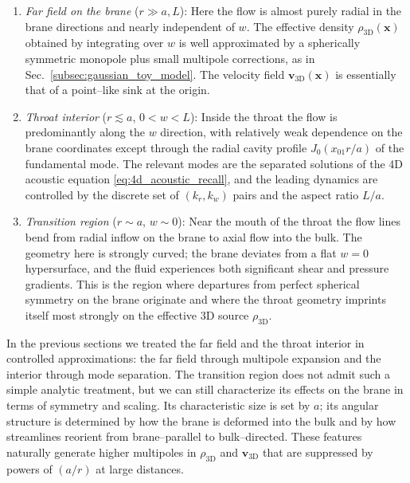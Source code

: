 \documentclass[12pt]{article}
\begin{document}
\begin{enumerate}
  \item \emph{Far field on the brane} ($r \gg a,L$): Here the flow is almost
  purely radial in the brane directions and nearly independent of $w$.  The
  effective density $\rho_{\mathrm{3D}}(\mathbf{x})$ obtained by integrating
  over $w$ is well approximated by a spherically symmetric monopole plus
  small multipole corrections, as in Sec.~\ref{subsec:gaussian_toy_model}.
  The velocity field $\mathbf{v}_{\mathrm{3D}}(\mathbf{x})$ is essentially
  that of a point--like sink at the origin.

  \item \emph{Throat interior} ($r \lesssim a$, $0<w<L$): Inside the throat
  the flow is predominantly along the $w$ direction, with relatively weak
  dependence on the brane coordinates except through the radial cavity
  profile $J_0(x_{01}r/a)$ of the fundamental mode.  The relevant modes are
  the separated solutions of the 4D acoustic equation
  \eqref{eq:4d_acoustic_recall}, and the leading dynamics are controlled by
  the discrete set of $(k_r,k_w)$ pairs and the aspect ratio $L/a$.

  \item \emph{Transition region} ($r\sim a$, $w\sim 0$): Near the mouth of
  the throat the flow lines bend from radial inflow on the brane to axial
  flow into the bulk.  The geometry here is strongly curved; the brane
  deviates from a flat $w=0$ hypersurface, and the fluid experiences both
  significant shear and pressure gradients.  This is the region where
  departures from perfect spherical symmetry on the brane originate and
  where the throat geometry imprints itself most strongly on the effective
  3D source $\rho_{\mathrm{3D}}$.
\end{enumerate}

In the previous sections we treated the far field and the throat interior in
controlled approximations: the far field through multipole expansion and the
interior through mode separation.  The transition region does not admit such
a simple analytic treatment, but we can still characterize its effects on
the brane in terms of symmetry and scaling.  Its characteristic size is set
by $a$; its angular structure is determined by how the brane is deformed
into the bulk and by how streamlines reorient from brane--parallel to
bulk--directed.  These features naturally generate higher multipoles in
$\rho_{\mathrm{3D}}$ and $\mathbf{v}_{\mathrm{3D}}$ that are suppressed by
powers of $(a/r)$ at large distances.
\end{document}
